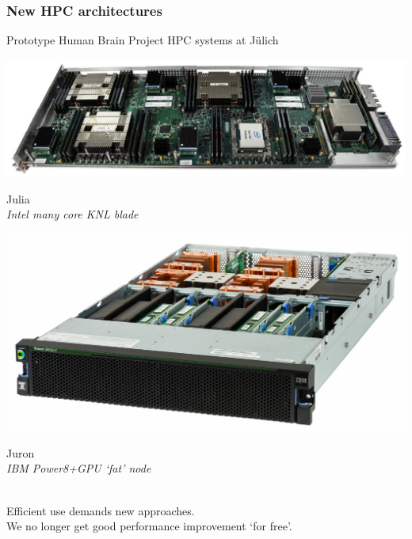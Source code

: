 \documentclass[aspectratio=43,12pt]{beamer}
\begin{document}
\begin{frame}
\frametitle{New HPC architectures}

\centering
Prototype Human Brain Project HPC systems at J\"ulich\\

\vfill
\begin{minipage}[t][0.3\textheight][t]{0.4\textwidth}
\includegraphics[width=\textwidth]{images/knlnode.jpg}

\vfill
{\small\centering
Julia\\
\em Intel many core KNL blade}
\end{minipage}
\hfill
\begin{minipage}[t][0.4\textheight][t]{0.4\textwidth}
\includegraphics[width=\textwidth]{images/juron.jpg}

\vfill
{\small\centering
Juron\\
\em IBM Power8+GPU `fat' node}
\end{minipage}
\\[2ex]

\vfill
Efficient use demands new approaches.\\
We no longer get good performance improvement `for free'.

\vfill
\end{frame}
\end{document}
